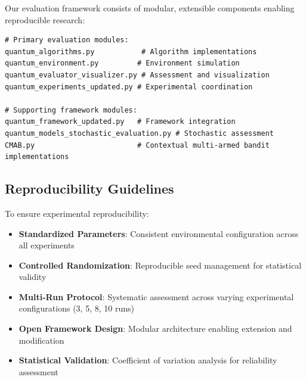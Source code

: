 \documentclass[12pt,a4paper]{article}
\begin{document}
Our evaluation framework consists of modular, extensible components enabling reproducible research:

\begin{lstlisting}[caption=Core Framework Components]
# Primary evaluation modules:
quantum_algorithms.py           # Algorithm implementations
quantum_environment.py         # Environment simulation
quantum_evaluator_visualizer.py # Assessment and visualization
quantum_experiments_updated.py # Experimental coordination

# Supporting framework modules:
quantum_framework_updated.py   # Framework integration
quantum_models_stochastic_evaluation.py # Stochastic assessment
CMAB.py                        # Contextual multi-armed bandit implementations
\end{lstlisting}

\subsection{Reproducibility Guidelines}

To ensure experimental reproducibility:

\begin{itemize}
\item \textbf{Standardized Parameters}: Consistent environmental configuration across all experiments
\item \textbf{Controlled Randomization}: Reproducible seed management for statistical validity
\item \textbf{Multi-Run Protocol}: Systematic assessment across varying experimental configurations (3, 5, 8, 10 runs)
\item \textbf{Open Framework Design}: Modular architecture enabling extension and modification
\item \textbf{Statistical Validation}: Coefficient of variation analysis for reliability assessment
\end{itemize}
\end{document}
